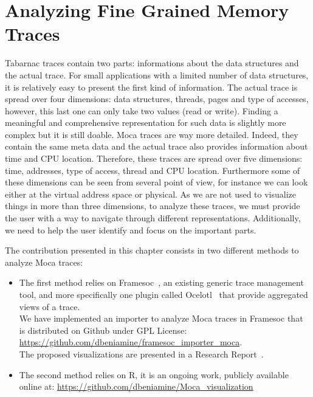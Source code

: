 \chapter{Analyzing Fine Grained Memory Traces}
\label{chap:analyzing}

\gls{Tabarnac} traces contain two parts: informations about the data structures and the actual trace.
For small applications with a limited number of data structures, it is relatively easy to present the first kind of information.
The actual trace is spread over four dimensions: data structures, threads, pages and type of accesses, however, this last one can only take two values (read or write).
Finding a meaningful and comprehensive representation for such data is slightly more complex but it is still doable.
\gls{Moca} traces are way more detailed.
Indeed, they contain the same meta data and the actual trace also provides information about time and \gls{CPU} location.
Therefore, these traces are spread over five dimensions: time, addresses, type of access, thread and \gls{CPU} location.
Furthermore some of these dimensions can be seen from several point of view, for instance we can look either at the virtual address space or physical.
As we are not used to visualize things in more than three dimensions, to analyze these traces, we must provide the user with a way to navigate through different representations.
Additionally, we need to help the user identify and focus on the important parts.

The contribution presented in this chapter consists in two different methods to analyze \gls{Moca} traces:
\begin{itemize}
    \item The first method relies on \gls{Framesoc}~\cite{Pagano14frameSoC}, an existing generic trace management tool, and more specifically one plugin called \gls{Ocelotl}~\cite{Dosimont14Ocelotl} that provide aggregated views of a trace.\\
        We have implemented an importer to analyze \gls{Moca} traces in \gls{Framesoc} that is distributed on Github under GPL License:\\
        \url{https://github.com/dbeniamine/framesoc\_importer\_moca}.\\
        The proposed visualizations are presented in a Research Report~\cite{Beniamine15Memory}.
    \item The second method relies on \gls{R}, it is an ongoing work, publicly available online at:
        \url{https://github.com/dbeniamine/Moca\_visualization}
\end{itemize}

